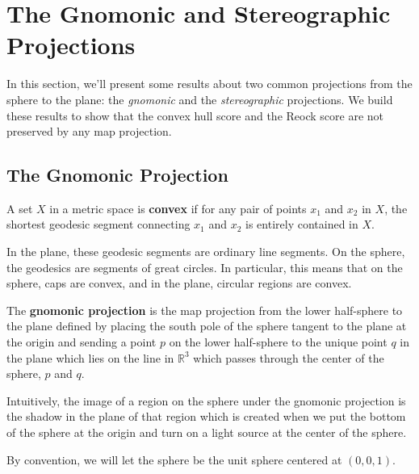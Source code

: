 \section{The Gnomonic and Stereographic Projections}
In this section, we'll present some results about two common
projections from the sphere to the plane: the \textit{gnomonic} and
the \textit{stereographic} projections.  We build these results to
show that the convex hull score and the Reock score are not preserved
by any map projection.

\subsection{The Gnomonic Projection}


\begin{definition}
	A set $X$ in a metric space is \textbf{convex} if for any pair of
	points $x_1$ and $x_2$ in $X$, the shortest geodesic segment
	connecting $x_1$ and $x_2$ is entirely contained in $X$. 
\end{definition}
In the plane, these geodesic segments are ordinary line segments.  On
the sphere, the geodesics are segments of great circles. In 
particular, this means that on the sphere, caps are 
convex, and in the plane, circular regions are convex.


\begin{definition}
	The \textbf{gnomonic projection} is the map projection from the
	lower half-sphere to the plane defined by placing the south pole of
	the sphere tangent to the plane at the origin and sending a point
	$p$ on the lower half-sphere to the unique point $q$ in the plane
	which lies on the line in $\mathbb{R}^3$ which passes through the
	center of the sphere, $p$ and $q$.
\end{definition}
Intuitively, the image of a region on the sphere under the gnomonic
projection is the shadow in the plane of that region which is
created when we put the bottom of the sphere at the origin and turn
on a light source at the center of the sphere.

By convention, we will let the sphere be the unit sphere 
centered at $(0,0,1)$.

